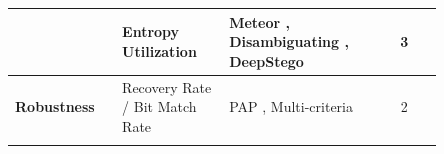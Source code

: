 \begin{table}[ht]
\begin{tabular}{|>{\raggedright\arraybackslash}p{0.25\linewidth}|>{\raggedright\arraybackslash}p{0.25\linewidth}|>{\raggedright\arraybackslash}p{0.35\linewidth}|c|}
                                & Entropy Utilization                 & Meteor \cite{kaptchuk2021meteor}, Disambiguating \cite{qi2024provably}, DeepStego \cite{kuznetsov2025deepstego}                                                                                                                                                                                                                                                                                                                                                                                                                                                                                                                                                                                                                                                                                                                                                                                                                                                                                  & 3                    \\
    \hline
    \textbf{Robustness}         & Recovery Rate / Bit Match Rate      & PAP \cite{lin2025positionagnostic}, Multi-criteria \cite{wozniak2025multicriteria}                                                                                                                                                                                                                                                                                                                                                                                                                                                                                                                                                                                                                                                                                                                                                                                                                                                                                                               & 2                    \\
    \cline{2-4}

\end{tabular}
\end{table}
